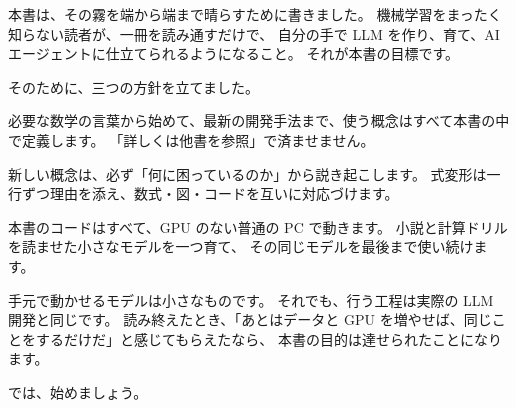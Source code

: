 本書は、その霧を端から端まで晴らすために書きました。
機械学習をまったく知らない読者が、一冊を読み通すだけで、
自分の手で LLM を作り、育て、AI エージェントに仕立てられるようになること。
それが本書の目標です。

そのために、三つの方針を立てました。

\begin{description}[leftmargin=1em,style=nextline]
\item[一冊で閉じる]
必要な数学の言葉から始めて、最新の開発手法まで、使う概念はすべて本書の中で定義します。
「詳しくは他書を参照」で済ませません。
\item[行間を埋める]
新しい概念は、必ず「何に困っているのか」から説き起こします。
式変形は一行ずつ理由を添え、数式・図・コードを互いに対応づけます。
\item[動かして確かめる]
本書のコードはすべて、GPU のない普通の PC で動きます。
小説と計算ドリルを読ませた小さなモデルを一つ育て、
その同じモデルを最後まで使い続けます。
\end{description}

手元で動かせるモデルは小さなものです。
それでも、行う工程は実際の LLM 開発と同じです。
読み終えたとき、「あとはデータと GPU を増やせば、同じことをするだけだ」と感じてもらえたなら、
本書の目的は達せられたことになります。

では、始めましょう。
